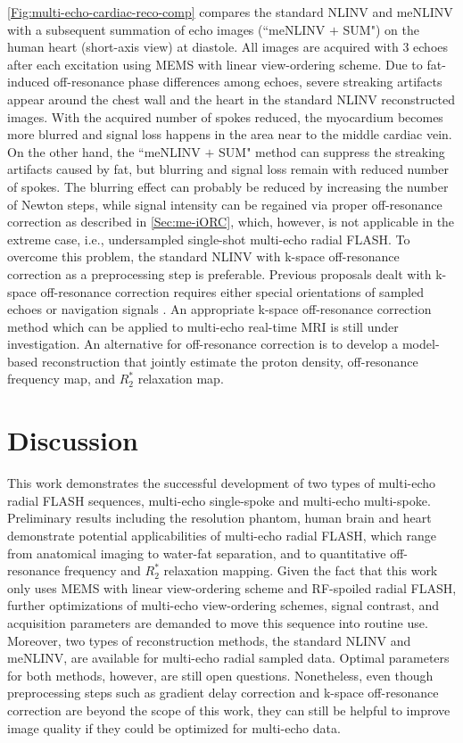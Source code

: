 \cref{Fig:multi-echo-cardiac-reco-comp} compares the standard NLINV and meNLINV with a subsequent summation of echo images (``meNLINV $+$ SUM") on the human heart (short-axis view) at diastole. All images are acquired with \num{3} echoes after each excitation using MEMS with linear view-ordering scheme. Due to fat-induced off-resonance phase differences among echoes, severe streaking artifacts appear around the chest wall and the heart in the standard NLINV reconstructed images. With the acquired number of spokes reduced, the myocardium becomes more blurred and signal loss happens in the area near to the middle cardiac vein. On the other hand, the ``meNLINV $+$ SUM" method can suppress the streaking artifacts caused by fat, but blurring and signal loss remain with reduced number of spokes. The blurring effect can probably be reduced by increasing the number of Newton steps, while signal intensity can be regained via proper off-resonance correction as described in \cref{Sec:me-iORC}, which, however, is not applicable in the extreme case, i.e., undersampled single-shot multi-echo radial FLASH. To overcome this problem, the standard NLINV with k-space off-resonance correction as a preprocessing step is preferable. Previous proposals dealt with k-space off-resonance correction requires either special orientations of sampled echoes \cite{1999_prMGE} or navigation signals \cite{2010_3D_rME}. An appropriate k-space off-resonance correction method which can be applied to multi-echo real-time MRI is still under investigation. An alternative for off-resonance correction is to develop a model-based reconstruction that jointly estimate the proton density, off-resonance frequency map, and $R_2^*$ relaxation map.

\section{Discussion}
This work demonstrates the successful development of two types of multi-echo radial FLASH sequences, multi-echo single-spoke and multi-echo multi-spoke. Preliminary results including the resolution phantom, human brain and heart demonstrate potential applicabilities of multi-echo radial FLASH, which range from anatomical imaging to water-fat separation, and to quantitative off-resonance frequency and $R_2^*$ relaxation mapping. Given the fact that this work only uses MEMS with linear view-ordering scheme and RF-spoiled radial FLASH, further optimizations of multi-echo view-ordering schemes, signal contrast, and acquisition parameters are demanded to move this sequence into routine use. Moreover, two types of reconstruction methods, the standard NLINV and meNLINV, are available for multi-echo radial sampled data. Optimal parameters for both methods, however, are still open questions. Nonetheless, even though preprocessing steps such as gradient delay correction and k-space off-resonance correction are beyond the scope of this work, they can still be helpful to improve image quality if they could be optimized for multi-echo data.

